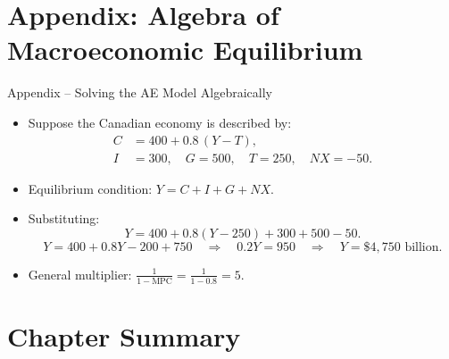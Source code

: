 \documentclass[aspectratio=169]{beamer}
\begin{document}
\section*{Appendix: Algebra of Macroeconomic Equilibrium}

\begin{frame}{Appendix -- Solving the AE Model Algebraically}
\transfade
\begin{itemize}[<+->]
  \item Suppose the Canadian economy is described by:
  \begin{align*}
    C &= 400 + 0.8\,(Y - T),\\
    I &= 300,\quad G = 500,\quad T = 250,\quad NX = -50.
  \end{align*}
  \item Equilibrium condition: $Y = C + I + G + NX$.
  \item Substituting:
  \[
    Y = 400 + 0.8(Y - 250) + 300 + 500 - 50.
  \]
  \[
    Y = 400 + 0.8Y - 200 + 750
    \quad \Rightarrow \quad
    0.2Y = 950
    \quad \Rightarrow \quad
    \boxed{Y = \$4{,}750 \text{ billion}}.
  \]
  \item General multiplier: $\frac{1}{1 - \text{MPC}} = \frac{1}{1 - 0.8} = 5$.
\end{itemize}
\end{frame}

\section*{Chapter Summary}
\end{document}
